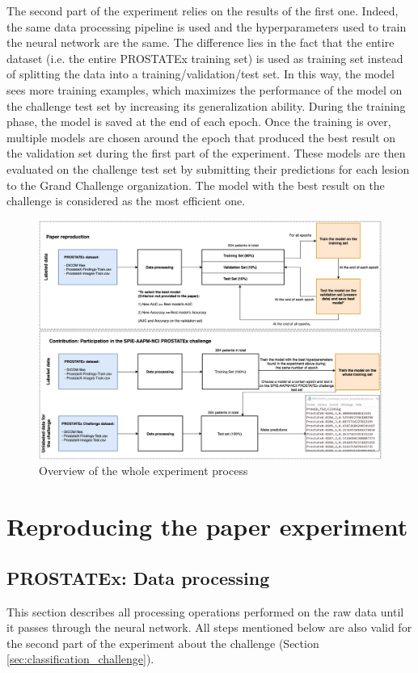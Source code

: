 The second part of the experiment relies on the results of the first one. Indeed, the same data processing pipeline is used and the hyperparameters used to train the neural network are the same. The difference lies in the fact that the entire dataset (i.e. the entire PROSTATEx training set) is used as training set instead of splitting the data into a training/validation/test set. In this way, the model sees more training examples, which maximizes the performance of the model on the challenge test set by increasing its generalization ability. During the training phase, the model is saved at the end of each epoch. Once the training is over, multiple models are chosen around the epoch that produced the best result on the validation set during the first part of the experiment. These models are then evaluated on the challenge test set by submitting their predictions for each lesion to the Grand Challenge organization. The model with the best result on the challenge is considered as the most efficient one.

\begin{figure}[!h]
\centering
\includegraphics[width=1\textwidth, keepaspectratio=true]{./figures/paper_reproduction_process.png}
\caption{Overview of the whole experiment process}
\label{fig:paper_reproduction_process}
\end{figure}

\section{Reproducing the paper experiment}

\subsection{PROSTATEx: Data processing}
\label{sec:prostatex_data_processing}
\setlength{\marginparwidth}{3cm}\leavevmode {}This section describes all processing operations performed on the raw data until it passes through the neural network. All steps mentioned below are also valid for the second part of the experiment about the challenge (Section \ref{sec:classification_challenge}).


